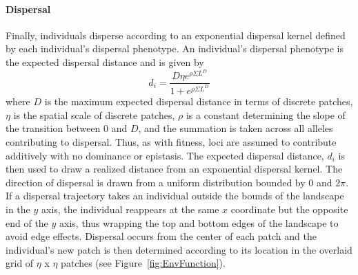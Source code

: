 \documentclass[11pt, oneside]{article}
\begin{document}
\paragraph{Dispersal}
Finally, individuals disperse according to an exponential dispersal kernel defined by each individual's dispersal phenotype. An individual's dispersal phenotype is the expected dispersal distance and is given by
\begin{equation}
d_{i} = \frac{D\eta e^{\rho\Sigma L^{D}}}{1+e^{\rho\Sigma L^{D}}} 
\end{equation}
where $D$ is the maximum expected dispersal distance in terms of discrete patches, $\eta$ is the spatial scale of discrete patches, $\rho$ is a constant determining the slope of the transition between $0$ and $D$, and the summation is taken across all alleles contributing to dispersal. Thus, as with fitness, loci are assumed to contribute additively with no dominance or epistasis. The expected dispersal distance, $d_{i}$ is then used to draw a realized distance from an exponential dispersal kernel. The direction of dispersal is drawn from a uniform distribution bounded by $0$ and $2\pi$. If a dispersal trajectory takes an individual outside the bounds of the landscape in the $y$ axis, the individual reappears at the same $x$ coordinate but the opposite end of the $y$ axis, thus wrapping the top and bottom edges of the landscape to avoid edge effects. Dispersal occurs from the center of each patch and the individual's new patch is then determined according to its location in the overlaid grid of $\eta$ x $\eta$ patches (see Figure~\ref{fig:EnvFunction}).
\end{document}
